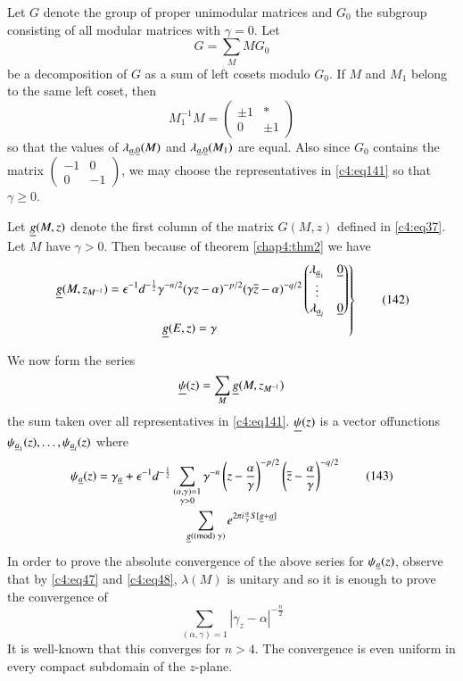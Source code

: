 Let $G$ denote the group of proper unimodular matrices and $G_{0}$ the
subgroup consisting of all modular matrices with $\gamma=0$. Let
\begin{equation*}
G=\sum_{M}MG_{0} \tag{141}\label{c4:eq141}
\end{equation*}
be a decomposition of $G$ as a sum of left cosets modulo $G_{0}$. If
$M$ and $M_{1}$ belong to the same left coset, then
$$
M^{-1}_{1}M=
\begin{pmatrix}
\pm 1 & \ast\\
0 & \pm 1
\end{pmatrix}
$$
so that the values of $\lambda_{\underline{a},\underline{0}}(M)$ and
$\lambda_{\underline{a},\underline{0}}(M_{1})$ are equal. Also since $G_{0}$
contains the matrix $\left(\begin{smallmatrix} -1 & 0\\ 0 & -1
\end{smallmatrix}\right)$, we may choose the representatives in
\eqref{c4:eq141} so that $\gamma\geq 0$.

Let $\underline{g}(M,z)$ denote the first column of the matrix $G(M,z)$
defined in \eqref{c4:eq37}. Let $M$ have $\gamma>0$. Then because of
theorem \ref{chap4:thm2} we have
\begin{equation*}
\left.
\begin{aligned}
& \ub{g}(M, z_{M^{-1}})=\epsilon^{-1}d^{-\frac{1}{2}}\gamma^{-n/2}(\gamma
  z-\alpha)^{-p/2}(\gamma\ob{z}-\alpha)^{-q/2}
\begin{pmatrix}
\lambda_{\ub{a}_{1}} & \ub{0}\\
\vdots & \\
\lambda_{\ub{a}_{l}} & \ub{0}
\end{pmatrix}\\
&\hspace{3cm} \ub{g}(E,z)=\gamma
\end{aligned}
\right\}\tag{142}\label{c4:eq142}
\end{equation*}

We now form the series
$$
\underline{\psi}(z)=\sum_{M}\underline{g}(M,z_{M^{-1}})
$$
the sum taken over all representatives in \eqref{c4:eq141}. $\underline{\psi}(z)$
is a vector of\pageoriginale functions
$\psi_{\underline{a}_{1}}(z),\ldots,\psi_{\underline{a}_{l}}(z)$ where
\begin{gather*}
\psi_{\underline{a}}(z)=\gamma_{\underline{a}}+\epsilon^{-1}d^{-\frac{1}{2}}\sum_{\substack{(\alpha,\gamma)=1\\ \gamma>0}}\gamma^{-n}\left(z-\frac{\alpha}{\gamma}\right)^{-p/2}\left(\overline{z}-\frac{\alpha}{\gamma}\right)^{-q/2}\tag{143}\label{c4:eq143}\\
\sum_{\underline{g}(\rm(mod) \; \gamma)}e^{2\pi
  i\frac{\alpha}{\gamma}S[\underline{g}+\underline{a}]} 
\end{gather*}
In order to prove the absolute convergence of the above series for
$\psi_{\underline{a}}(z)$, observe that by \eqref{c4:eq47} and \eqref{c4:eq48},
$\lambda(M)$ is unitary and so it is enough to prove the convergence
of
$$
\sum_{(\alpha,\gamma)=1}|\gamma_{z}-\alpha|^{-\frac{n}{2}} 
$$
It is well-known that this converges for $n>4$. The convergence is
even uniform in every compact subdomain of the $z$-plane.

